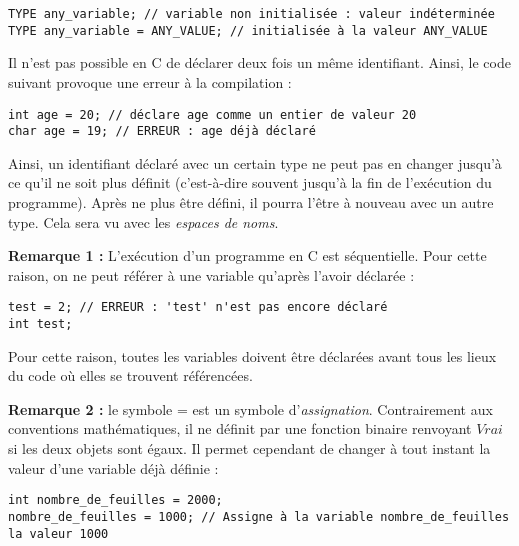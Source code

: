 \documentclass[../../../main.tex]{subfiles}
\begin{document}
\begin{verbatim}
TYPE any_variable; // variable non initialisée : valeur indéterminée
TYPE any_variable = ANY_VALUE; // initialisée à la valeur ANY_VALUE
\end{verbatim}
Il n'est pas possible en C de déclarer deux fois un même identifiant. Ainsi, le code suivant provoque une erreur à la compilation :
\begin{verbatim}
int age = 20; // déclare age comme un entier de valeur 20
char age = 19; // ERREUR : age déjà déclaré
\end{verbatim}
Ainsi, un identifiant déclaré avec un certain type ne peut pas en changer jusqu'à ce qu'il ne soit plus définit (c'est-à-dire souvent jusqu'à la fin de l'exécution du programme). Après ne plus être défini, il pourra l'être à nouveau avec un autre type. Cela sera vu avec les \textit{espaces de noms}.
 
\textbf{Remarque 1 :} L'exécution d'un programme en C est séquentielle. Pour cette raison, on ne peut référer à une variable qu'après l'avoir déclarée :
\begin{verbatim}
test = 2; // ERREUR : 'test' n'est pas encore déclaré
int test;
\end{verbatim}
Pour cette raison, toutes les variables doivent être déclarées avant tous les lieux du code où elles se trouvent référencées.
 
\textbf{Remarque 2 :} le symbole \textsf{=} est un symbole d'\textit{assignation}. Contrairement aux conventions mathématiques, il ne définit par une fonction binaire renvoyant $Vrai$ si les deux objets sont égaux. Il permet cependant de changer à tout instant la valeur d'une variable déjà définie :
\begin{verbatim}
int nombre_de_feuilles = 2000;
nombre_de_feuilles = 1000; // Assigne à la variable nombre_de_feuilles la valeur 1000
\end{verbatim}
\end{document}
